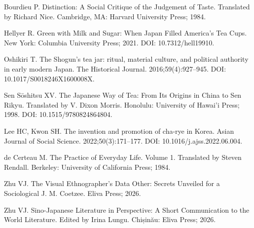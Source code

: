 \documentclass[11pt,a4paper]{article}
\newenvironment{refs}{%
  \begin{list}{}{%
    \setlength{\leftmargin}{1.6em}
    \setlength{\itemindent}{-1.6em}
    \setlength{\itemsep}{0.6em}
    \setlength{\parsep}{0pt}
  }
}{\end{list}}
\newcommand{\refitem}[2]{\item[] [#1] #2}
\begin{document}
\begin{refs}
\refitem{13}{Bourdieu P. Distinction: A Social Critique of the Judgement of Taste. Translated by Richard Nice. Cambridge, MA: Harvard University Press; 1984.}

\refitem{14}{Hellyer R. Green with Milk and Sugar: When Japan Filled America's Tea Cups. New York: Columbia University Press; 2021. DOI: 10.7312/hell19910.}

\refitem{15}{Oshikiri T. The Shogun's tea jar: ritual, material culture, and political authority in early modern Japan. The Historical Journal. 2016;59(4):927--945. DOI: 10.1017/S0018246X1600008X.}

\refitem{16}{Sen Sōshitsu XV. The Japanese Way of Tea: From Its Origins in China to Sen Rikyu. Translated by V. Dixon Morris. Honolulu: University of Hawai'i Press; 1998. DOI: 10.1515/9780824864804.}

\refitem{17}{Lee HC, Kwon SH. The invention and promotion of cha-rye in Korea. Asian Journal of Social Science. 2022;50(3):171--177. DOI: 10.1016/j.ajss.2022.06.004.}

\refitem{18}{de Certeau M. The Practice of Everyday Life. Volume 1. Translated by Steven Rendall. Berkeley: University of California Press; 1984.}

\refitem{19}{Zhu VJ. The Visual Ethnographer's Data Other: Secrets Unveiled for a Sociological J. M. Coetzee. Eliva Press; 2026.}

\refitem{20}{Zhu VJ. Sino-Japanese Literature in Perspective: A Short Communication to the World Literature. Edited by Irina Lungu. Chișinău: Eliva Press; 2026.}
\end{refs}
\end{document}
